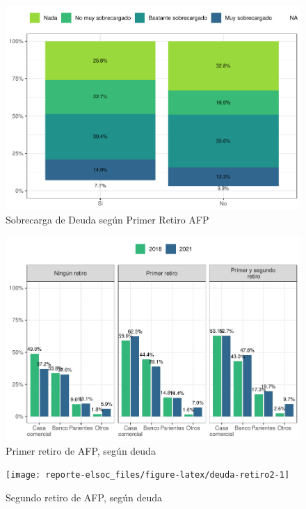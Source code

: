\documentclass[
  12pt,
  openany]{book}
\begin{document}
\begin{figure}

{\centering \includegraphics{reporte-elsoc_files/figure-latex/endeud-2retiro-1} 

}

\caption{Sobrecarga de Deuda según Primer Retiro AFP}\label{fig:endeud-2retiro}
\end{figure}

\begin{figure}

{\centering \includegraphics{reporte-elsoc_files/figure-latex/deuda-retiro1-1} 

}

\caption{Primer retiro de AFP, según deuda}\label{fig:deuda-retiro1}
\end{figure}

\begin{figure}

{\centering \texttt{[image: reporte-elsoc\_files/figure-latex/deuda-retiro2-1]} 

}

\caption{Segundo retiro de AFP, según deuda}\label{fig:deuda-retiro2}
\end{figure}
\end{document}

